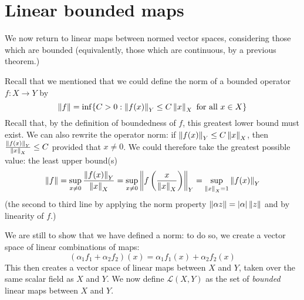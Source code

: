 \section{Linear bounded maps}

We now return to linear maps between normed vector spaces, considering those which are bounded (equivalently, those which are continuous, by a previous theorem.)

Recall that we mentioned that we could define the norm of a bounded operator $f : X \to Y$ by \[ \left\lVert f \right\rVert = \inf \{ C > 0 : \left\lVert f(x) \right\rVert_{Y} \leq C \left\lVert x \right\rVert_{X} \text{ for all } x\in X \} \] Recall that, by the definition of boundedness of $f$, this greatest lower bound must exist. 
We can also rewrite the operator norm: if \mbox{$\left\lVert f(x) \right\rVert_{Y} \leq C \left\lVert x \right\rVert_{X}$}, then \mbox{$\frac{\left\lVert f(x) \right\rVert_{Y}}{\left\lVert x \right\rVert_{X}} \leq C$} provided that $x\neq 0$. We could therefore take the greatest possible value: the least upper bound(s) \[ \left\lVert f \right\rVert = \sup_{x\neq 0}\frac{\left\lVert f(x) \right\rVert_{Y}}{\left\lVert x \right\rVert_{X}} = \sup_{x\neq 0} {\left\lVert f\left(\frac{x}{\left\lVert x \right\rVert_{X}}\right) \right\rVert}_{Y} = \sup_{\left\lVert x \right\rVert_{X} = 1} \left\lVert f(x) \right\rVert_{Y} \] (the second to third line by applying the norm property \mbox{$\left\lVert \alpha z \right\rVert = |\alpha| \left\lVert z \right\rVert$} and by linearity of $f$.)

We are still to show that we have defined a norm: to do so, we create a vector space of linear combinations of maps: \[ (\alpha_{1} f_{1} + \alpha_{2} f_{2} )(x) = \alpha_{1} f_{1}(x) + \alpha_{2} f_{2}(x) \] This then creates a vector space of linear maps between $X$ and $Y$, taken over the same scalar field as $X$ and $Y$. We now define $\mathcal{L}(X,Y)$ as the set of \emph{bounded} linear maps between $X$ and $Y$.

